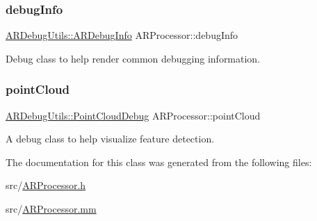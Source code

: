 \subsubsection{\texorpdfstring{debug\+Info}{debugInfo}}
{\footnotesize\ttfamily \hyperlink{class_a_r_debug_utils_1_1_a_r_debug_info}{A\+R\+Debug\+Utils\+::\+A\+R\+Debug\+Info} A\+R\+Processor\+::debug\+Info}



Debug class to help render common debugging information. 

\mbox{\label{class_a_r_processor_a555e829fbf6b625537f6fd7cd9557002}} 
\subsubsection{\texorpdfstring{point\+Cloud}{pointCloud}}
{\footnotesize\ttfamily \hyperlink{class_a_r_debug_utils_1_1_point_cloud_debug}{A\+R\+Debug\+Utils\+::\+Point\+Cloud\+Debug} A\+R\+Processor\+::point\+Cloud}



A debug class to help visualize feature detection. 



The documentation for this class was generated from the following files\+:\begin{DoxyCompactItemize}
\item 
src/\hyperlink{_a_r_processor_8h}{A\+R\+Processor.\+h}\item 
src/\hyperlink{_a_r_processor_8mm}{A\+R\+Processor.\+mm}\end{DoxyCompactItemize}

